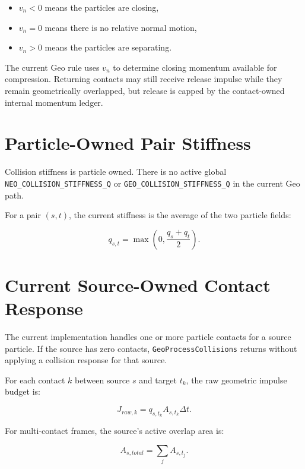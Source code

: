 \begin{itemize}[leftmargin=*]
    \item $v_n < 0$ means the particles are closing,
    \item $v_n = 0$ means there is no relative normal motion,
    \item $v_n > 0$ means the particles are separating.
\end{itemize}

The current Geo rule uses $v_n$ to determine closing momentum available for
compression.  Returning contacts may still receive release impulse while they
remain geometrically overlapped, but release is capped by the contact-owned
internal momentum ledger.

\section{Particle-Owned Pair Stiffness}
\label{sec:pair-stiffness}

Collision stiffness is particle owned.  There is no active global
\texttt{NEO\_COLLISION\_STIFFNESS\_Q} or
\texttt{GEO\_COLLISION\_STIFFNESS\_Q} in the current Geo path.

For a pair $(s,t)$, the current stiffness is the average of the two particle
fields:

\begin{equation}
q_{s,t} = \max\left(0,\frac{q_s + q_t}{2}\right).
\end{equation}

\section{Current Source-Owned Contact Response}
\label{sec:current-source-owned-contact-response}

The current implementation handles one or more particle contacts for a source
particle.  If the source has zero contacts, \texttt{GeoProcessCollisions}
returns without applying a collision response for that source.

For each contact $k$ between source $s$ and target $t_k$, the raw geometric
impulse budget is:

\begin{equation}
J_{raw,k} = q_{s,t_k} A_{s,t_k} \Delta t.
\end{equation}

For multi-contact frames, the source's active overlap area is:

\begin{equation}
A_{s,total} = \sum_j A_{s,t_j}.
\end{equation}

